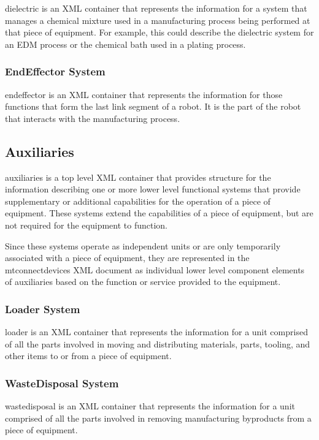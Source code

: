 \documentclass{mtconnect}	%
\providecommand{\DIFadd}[1]{{\hspace{0pt}\protect\color{blue}#1}} %
\providecommand{\DIFaddbegin}{} %
\providecommand{\DIFaddend}{} %
\begin{document}
\gls{dielectric} is an XML container that represents the information for a system that manages a chemical mixture used in a manufacturing process being performed at that piece of equipment.  For example, this could describe the dielectric system for an EDM process or the chemical bath used in a plating process. 

\DIFaddbegin \subsubsection{\DIFadd{EndEffector System}}

\DIFadd{\gls{endeffector} is an XML container that represents the information for those functions that form the last link segment of a robot. It is the part of the robot that interacts with the manufacturing process.
}\DIFaddend \subsection{Auxiliaries}

\gls{auxiliaries} is a \gls{top level} XML container that provides structure for the information describing one or more \gls{lower level} functional systems that provide supplementary or additional capabilities for the operation of a piece of equipment.  These systems extend the capabilities of a piece of equipment, but are not required for the equipment to function.

Since these systems operate as independent units or are only temporarily associated with a piece of equipment, they are represented in the \gls{mtconnectdevices} XML document as individual \gls{lower level} \gls{component} elements of \gls{auxiliaries} based on the function or service provided to the equipment.

\subsubsection{Loader System}

\gls{loader} is an XML container that represents the information for a unit comprised of all the parts involved in moving and distributing materials, parts, tooling, and other items to or from a piece of equipment.

\subsubsection{WasteDisposal System}

\gls{wastedisposal} is an XML container that represents the information for a unit comprised of all the parts involved in removing manufacturing byproducts from a piece of equipment.
\end{document}
